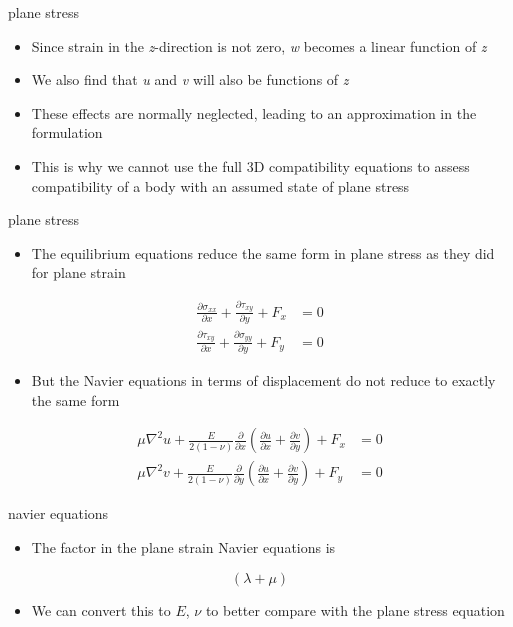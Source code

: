 \documentclass[
  letterpaper,
  ignorenonframetext,
  aspectratio=43,
  handout,
  12pt]{beamer}
\providecommand{\tightlist}{%
  \setlength{\itemsep}{0pt}\setlength{\parskip}{0pt}}
\providecommand{\tightlist}{%
\setlength{\itemsep}{0pt}\setlength{\parskip}{0pt}}
\begin{document}
\begin{frame}{plane stress}
\protect\hypertarget{plane-stress-4}{}
\begin{itemize}
\tightlist
\item
  Since strain in the \emph{z}-direction is not zero, \emph{w} becomes a
  linear function of \emph{z}
\item
  We also find that \emph{u} and \emph{v} will also be functions of
  \emph{z}
\item
  These effects are normally neglected, leading to an approximation in
  the formulation
\item
  This is why we cannot use the full 3D compatibility equations to
  assess compatibility of a body with an assumed state of plane stress
\end{itemize}
\end{frame}

\begin{frame}{plane stress}
\protect\hypertarget{plane-stress-5}{}
\begin{itemize}
\tightlist
\item
  The equilibrium equations reduce the same form in plane stress as they
  did for plane strain
\end{itemize}

\[\begin{aligned}
    \frac{\partial \sigma_{xx}}{\partial x} + \frac{\partial \tau_{xy}}{\partial y} + F_x &= 0\\
    \frac{\partial \tau_{xy}}{\partial x} +\frac{\partial \sigma_{yy}}{\partial y} +  F_y &= 0
\end{aligned}\]

\begin{itemize}
\tightlist
\item
  But the Navier equations in terms of displacement do not reduce to
  exactly the same form
\end{itemize}

\[\begin{aligned}
    \mu \nabla^2 u + \frac{E}{2(1-\nu)} \frac{\partial}{\partial x} \left(\frac{\partial u}{\partial x} + \frac{\partial v}{\partial y}\right) + F_x &= 0\\
    \mu \nabla^2 v + \frac{E}{2(1-\nu)} \frac{\partial}{\partial y} \left(\frac{\partial u}{\partial x} + \frac{\partial v}{\partial y}\right) + F_y &= 0
\end{aligned}\]
\end{frame}

\begin{frame}{navier equations}
\protect\hypertarget{navier-equations}{}
\begin{itemize}
\tightlist
\item
  The factor in the plane strain Navier equations is
\end{itemize}

\[(\lambda + \mu)\]

\begin{itemize}
\tightlist
\item
  We can convert this to \(E\), \(\nu\) to better compare with the plane
  stress equation
\end{itemize}
\end{frame}
\end{document}
